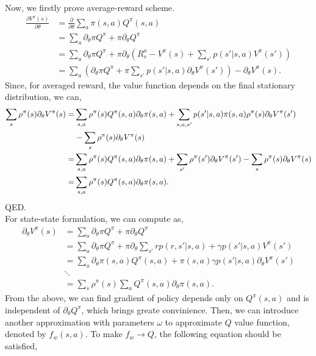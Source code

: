 \documentclass[11pt,a4paper]{article}
\begin{document}
Now, we firstly prove average-reward scheme.
\begin{align}
\frac{\partial V^{\pi}(s)}{\partial \theta} & = \frac{\partial}{\partial \theta}\sum_a \pi(s,a)Q^{\pi}(s,a) \\ 
& = \sum_a \partial_{\theta}\pi Q^{\pi} + \pi \partial_{\theta}Q^{\pi} \\ 
& = \sum_a \partial_{\theta}\pi Q^{\pi} + \pi \partial_{\theta}\left(R_{s}^a - V^{\pi}(s)+\sum_{s'}p(s'|s,a)V^{\pi}(s')\right)\\ 
& = \sum_{a}\left(\partial_{\theta}\pi Q^{\pi} + \pi\sum_{s'}p(s'|s,a)\partial_{\theta}V^{\pi}(s')\right) - \partial_{\theta}V^{\pi}(s).
\end{align}
Since, for averaged reward, the value function depends on the final stationary distribution, we can,
\begin{equation}
\aligned
\sum_{s}\rho^{\pi}(s)\partial_{\theta}V^{\pi}(s) = &\sum_{s,a}\rho^{\pi}(s)Q^{\pi}(s,a)\partial_{\theta}\pi(s,a) + \sum_{s,a,s'}p(s'|s,a)\pi(s,a)\rho^{\pi}(s)\partial_{\theta}V^{\pi}(s')\\ & - \sum_{s}\rho^{\pi}(s)\partial_{\theta}V^{\pi}(s)\\ 
= & \sum_{s,a}\rho^{\pi}(s)Q^{\pi}(s,a)\partial_{\theta}\pi(s,a) + \sum_{s'}\rho^{\pi}(s')\partial_{\theta}V^{\pi}(s') - \sum_{s}\rho^{\pi}(s)\partial_{\theta} V^{\pi}(s)\\ 
= & \sum_{s,a}\rho^{\pi}(s)Q^{\pi}(s,a)\partial_{\theta}\pi(s,a).
\endaligned
\end{equation}
QED.\\ 
For state-state formulation, we can compute as,
\begin{align}
\partial_{\theta}V^{\pi}(s) & = \sum_{a}\partial_{\theta}\pi Q^{\pi} + \pi \partial_{\theta}Q^\pi \\ 
& = \sum_a \partial_{\theta}\pi Q^{\pi} + \pi \partial_{\theta}\sum_{s'}rp(r,s'|s,a)+\gamma p(s'|s,a)V^{\pi}(s')\\ 
& = \sum_a \partial_{\theta}\pi(s,a) Q^{\pi}(s,a) + \pi(s,a) \gamma p(s'|s,a)\partial_{\theta}V^{\pi}(s') \\ 
& \ddots \\ 
& = \sum_{s}\rho^{\pi}(s)\sum_{a}Q^{\pi}(s,a)\partial_{\theta}\pi(s,a).
\end{align}
From the above, we can find gradient of policy depends only on $Q^{\pi}(s,a)$ and is independent of $\partial_{\theta}Q^{\pi}$, which brings greate convinience. Then, we can introduce another approximation with parameters $\omega$ to approximate $Q$ value function, denoted by $f_{w}(s,a)$. To make $f_w \to Q$, the following equation should be satisfied,
\end{document}
